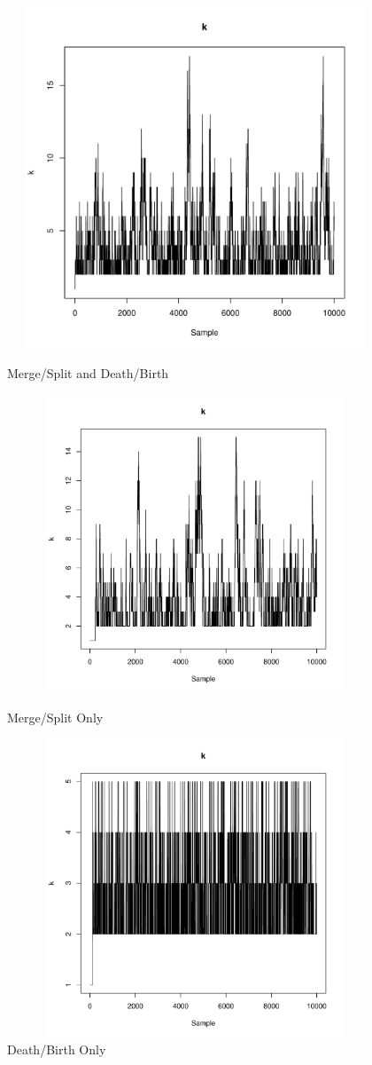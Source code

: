 \documentclass{article}
\begin{document}
\begin{figure}
	\begin{minipage}[h!]{0.49\textwidth}
		\centering
		\includegraphics[width=1\textwidth, height=4in]{kTrace.pdf}
		\caption{Merge/Split and Death/Birth}	
	\end{minipage}
	\begin{minipage}[h!]{0.49\textwidth}
		\centering
		\includegraphics[width=1\textwidth, height=3.5in]{kTraceMSOnly.pdf}
		\caption{Merge/Split Only}	
		\includegraphics[width=1\textwidth, height=3.5in]{kTraceDBOnly.pdf}
		\caption{Death/Birth Only}
	\end{minipage}
\end{figure}
\end{document}

